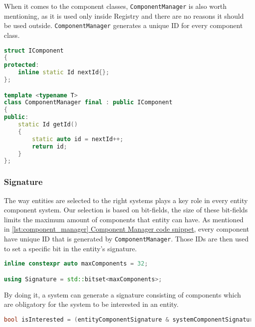 When it comes to the component classes, \texttt{ComponentManager} is also worth mentioning, as it is used only inside Registry and there are no reasons it should be used outside. \texttt{ComponentManager} generates a unique ID for every component class.
\label{lst:component_manager}
\begin{lstlisting}[language=c++, caption=\texttt{IComponent} and \texttt{ComponentManager} classes (./engine/include/tsengine/ecs/ecs.h)]
struct IComponent
{
protected:
    inline static Id nextId{};
};

template <typename T>
class ComponentManager final : public IComponent
{
public:
    static Id getId()
    {
        static auto id = nextId++;
        return id;
    }
};
\end{lstlisting}

\newpage

\subsubsection{Signature}
\hspace{\parindent}
The way entities are selected to the right systems plays a key role in every entity component system.
Our selection is based on bit-fields, the size of these bit-fields limits the maximum amount of components that entity can have.
As mentioned in \hyperref[lst:component_manager]{\ref*{lst:component_manager} Component Manager code snippet}, every component have unique ID that is generated by \texttt{ComponentManager}. Those IDs are then used to set a specific bit in the entity's signature.
\begin{lstlisting}[language=c++, caption=\texttt{Signature} declaration (./engine/include/tsengine/ecs/ecs.h)]
inline constexpr auto maxComponents = 32;

using Signature = std::bitset<maxComponents>;
\end{lstlisting}

By doing it, a system can generate a signature consisting of components which are obligatory for the system to be interested in an entity.
\begin{lstlisting}[language=c++, caption=Signature evaluation (./engine/include/tsengine/ecs/ecs.h)]
bool isInterested = (entityComponentSignature & systemComponentSignature) == systemComponentSignature;
\end{lstlisting}

\newpage

